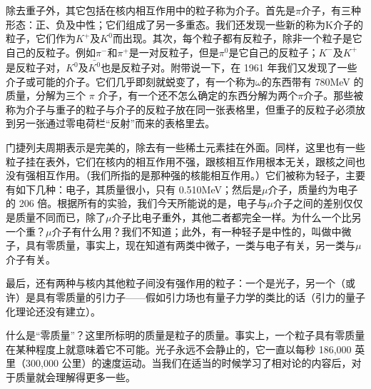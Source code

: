 \documentclass[12pt,oneside]{book}
\begin{document}
\begin{common-format}
除去重子外，其它包括在核内相互作用中的粒子称为介子。首先是$\pi$介子，有三种形态：正、负及中性；它们组成了另一多重态。我们还发现一些新的称为K介子的粒子，它们作为$ K^{+} $及$ { K }^{ 0 } $而出现。其次，每个粒子都有反粒子，除非一个粒子是它自己的反粒子。例如$\pi^{-} $和$\pi^{+} $是一对反粒子，但是$\pi^0 $是它自己的反粒子；$K^- $及$ K^+ $是反粒子对，$ { K }^{ 0 } $及$ \bar {{ K }^{ 0 } }  $也是反粒子对。附带说一下，在 1961 年我们又发现了一些介子或可能的介子。它们几乎即刻就蜕变了，有一个称为$\omega$的东西带有 780MeV 的质量，分解为三个 $\pi$ 介子，有一个还不怎么确定的东西分解为两个$\pi$介子。那些被称为介子与重子的粒子与介子的反粒子放在同一张表格里，但重子的反粒子必须放到另一张通过零电荷栏“反射”而来的表格里去。

门捷列夫周期表示是完美的，除去有一些稀土元素挂在外面。同样，这里也有一些粒子挂在表外，它们在核内的相互作用不强，跟核相互作用根本无关，跟核之间也没有强相互作用。（我们所指的是那种强的核能相互作用。）它们被称为轻子，主要有如下几种：电子，其质量很小，只有 0.510MeV；然后是$\mu$介子，质量约为电子的 206 倍。根据所有的实验，我们今天所能说的是，电子与$\mu$介子之间的差别仅仅是质量不同而已，除了$\mu$介子比电子重外，其他二者都完全一样。为什么一个比另一个重？$\mu$介子有什么用？我们不知道；此外，有一种轻子是中性的，叫做中微子，具有零质量，事实上，现在知道有两类中微子，一类与电子有关，另一类与$\mu$介子有关。

最后，还有两种与核内其他粒子间没有强作用的粒子：一个是光子，另一个（或许）是具有零质量的引力子——假如引力场也有量子力学的类比的话（引力的量子化理论还没有建立）。

什么是“零质量”？这里所标明的质量是粒子的质量。事实上，一个粒子具有零质量在某种程度上就意味着它不可能。光子永远不会静止的，它一直以每秒 186,000 英里（300,000 公里）的速度运动。当我们在适当的时候学习了相对论的内容后，对于质量就会理解得更多一些。


\end{common-format}
\end{document}
